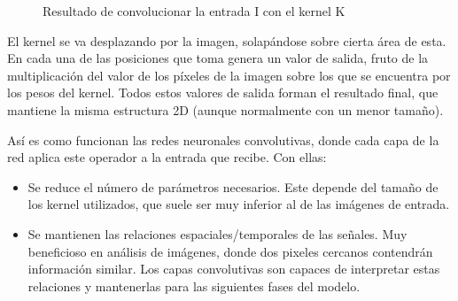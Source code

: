 \begin{figure}[H]
\centering
    \caption{Resultado de convolucionar la entrada I con el kernel K \cite{Goodfellow-et-al-2016}}
    \label{fig:ejemplo-convolucion}
\end{figure}

El kernel se va desplazando por la imagen, solapándose sobre cierta área de esta. En cada una de las posiciones que toma genera un valor de salida, fruto de la multiplicación del valor de los píxeles de la imagen sobre los que se encuentra por los pesos del kernel. Todos estos valores de salida forman el resultado final, que mantiene la misma estructura 2D (aunque normalmente con un menor tamaño). 

Así es como funcionan las redes neuronales convolutivas, donde cada capa de la red aplica este operador a la entrada que recibe. Con ellas:
\begin{itemize}
    \item Se reduce el número de parámetros necesarios. Este depende del tamaño de los kernel utilizados, que suele ser muy inferior al de las imágenes de entrada.
    \item Se mantienen las relaciones espaciales/temporales de las señales. Muy beneficioso en análisis de imágenes, donde dos pixeles cercanos contendrán información similar. Los capas convolutivas son capaces de interpretar estas relaciones y mantenerlas para las siguientes fases del modelo. \cite{Goodfellow-et-al-2016}
\end{itemize}

